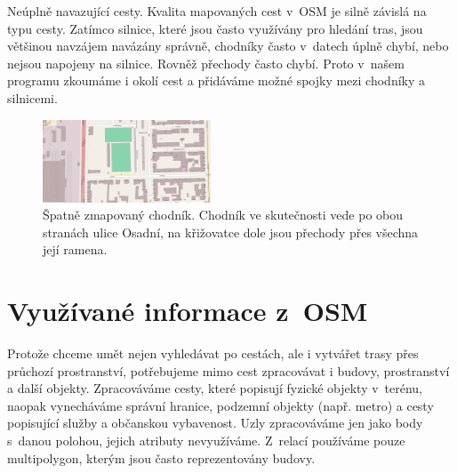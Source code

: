 {\tuc Neúplně navazující cesty.} Kvalita mapovaných cest v~OSM je silně závislá na typu
cesty. Zatímco silnice, které jsou často využívány pro hledání tras, jsou
většinou navzájem navázány správně, chodníky často v~datech úplně chybí, nebo
nejsou napojeny na silnice. Rovněž přechody často chybí. Proto v~našem programu
zkoumáme i okolí cest a přidáváme možné spojky mezi chodníky a silnicemi.
\begin{figure}
	\centering
	\includegraphics[width=50mm]{../img/chodnik.pdf}
	\caption{Špatně zmapovaný chodník. Chodník ve skutečnosti vede po obou
	stranách ulice Osadní, na křižovatce dole jsou přechody přes všechna
	její ramena.}
	\label{fig:chodnik}
\end{figure}

\section{Využívané informace z~OSM}
Protože chceme umět nejen vyhledávat po cestách, ale i vytvářet trasy přes
průchozí prostranství, potřebujeme mimo cest zpracovávat i budovy, prostranství 
a další objekty. Zpracováváme cesty, které popisují fyzické objekty v~terénu,
naopak vynecháváme správní hranice, podzemní objekty (např. metro) a cesty
popisující služby a občanskou vybavenost. Uzly zpracováváme jen jako body
s~danou polohou, jejich atributy nevyužíváme. Z~relací používáme pouze
multipolygon, kterým jsou často reprezentovány budovy.

